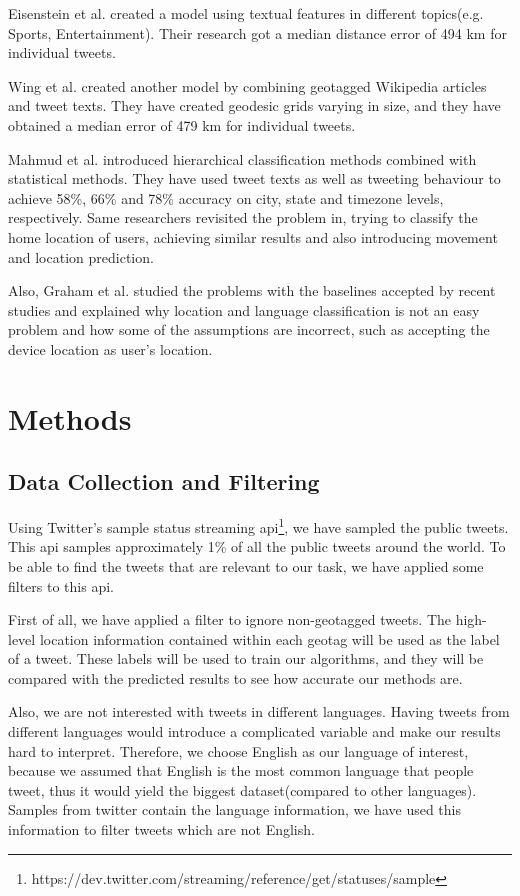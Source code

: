 \documentclass[twoside,11pt]{article}
\begin{document}
Eisenstein et al. created a model using textual features in different topics(e.g. Sports, Entertainment)\cite{eisenstein2010latent}. Their research got a median distance error of 494 km for individual tweets.

Wing et al. created another model by combining geotagged Wikipedia articles and tweet texts\cite{wing2011simple}. They have created geodesic grids varying in size, and they have obtained a median error of 479 km for individual tweets. 

Mahmud et al. introduced hierarchical classification methods combined with statistical methods\cite{mahmud2012tweet}. They have used tweet texts as well as tweeting behaviour to achieve 58\%, 66\% and 78\% accuracy on city, state and timezone levels, respectively.  Same researchers revisited the problem in, trying to classify the home location of users, achieving similar results and also introducing movement and location prediction\cite{mahmud2014home}. 

Also, Graham et al. studied the problems with the baselines accepted by recent studies and explained why location and language classification is not an easy problem and how some of the assumptions are incorrect, such as accepting the device location as user's location\cite{graham2014world}. 

\section{Methods}

\subsection{Data Collection and Filtering}

Using Twitter's sample status streaming api\footnote{https://dev.twitter.com/streaming/reference/get/statuses/sample}, we have sampled the public tweets. This api samples approximately 1\% of all the public tweets around the world. To be able to find the tweets that are relevant to our task, we have applied some filters to this api. 

First of all, we have applied a filter to ignore non-geotagged tweets. The high-level location information contained within each geotag will be used as the label of a tweet. These labels will be used to train our algorithms, and they will be compared with the predicted results to see how accurate our methods are.

Also, we are not interested with tweets in different languages. Having tweets from different languages would introduce a complicated variable and make our results hard to interpret. Therefore, we choose English as our language of interest, because we assumed that English is the most common language that people tweet, thus it would yield the biggest dataset(compared to other languages). Samples from twitter contain the language information, we have used this information to filter tweets which are not English. 
\end{document}
